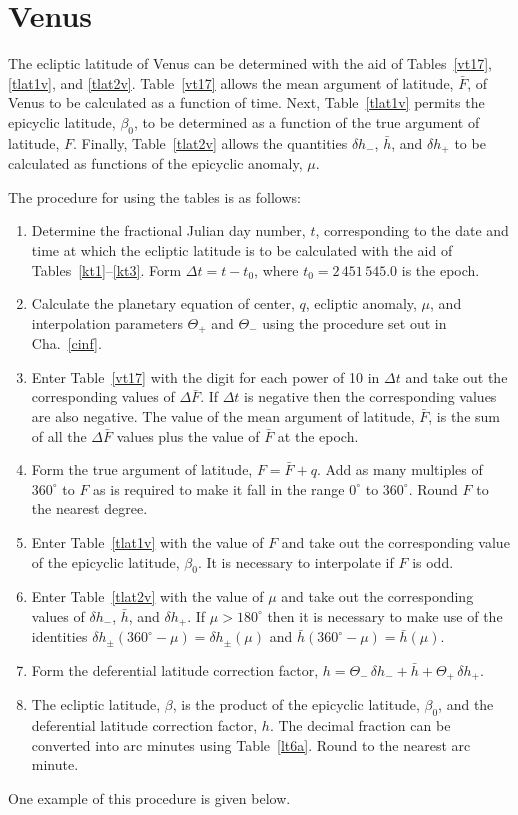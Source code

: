 \section{Venus}
The ecliptic latitude of Venus can be determined with the aid of Tables~\ref{vt17}, \ref{tlat1v}, and \ref{tlat2v}. Table~\ref{vt17} allows
the mean argument of latitude, $\bar{F}$, of Venus to be calculated as a function of
time. Next, Table~\ref{tlat1v} permits the epicyclic  latitude, $\beta_0$, to
be determined as a function of the true argument of latitude, $F$. Finally, Table~\ref{tlat2v} allows the quantities
$\delta h_-$, $\bar{h}$, and $\delta h_+$ to be calculated as functions of the epicyclic
anomaly, $\mu$. 

The procedure for using the tables is as follows:
\begin{enumerate}
\item Determine the fractional Julian day number, $t$, corresponding to the date and time
at which the ecliptic latitude is to be calculated with the aid of Tables~\ref{kt1}--\ref{kt3}. Form $\Delta t = t-t_0$, where $t_0=2\,451\,545.0$ is the epoch. 
\item Calculate the planetary equation
of center, $q$,  ecliptic anomaly, $\mu$, and 
interpolation parameters $\Theta_+$ and $\Theta_-$ using the
procedure set out in Cha.~\ref{cinf}.
\item Enter Table~\ref{vt17} with the digit for each power of 10
in ${\Delta} t$ and take out the corresponding values of $\Delta\bar{F}$. If $\Delta t$ is negative then the corresponding
values are also negative.
The value of the mean argument of latitude, $\bar{F}$, is the
sum of all the $\Delta\bar{F}$ values plus the value of $\bar{F}$ at the epoch.  
\item Form the true argument of latitude,
$F=\bar{F} + q$. Add as many multiples of $360^\circ$ to $F$ 
as is required to make it fall in the range $0^\circ$ to $360^\circ$.
Round $F$ to the nearest degree.
\item Enter Table~\ref{tlat1v} with the value of $F$ and take out the
corresponding value of the epicyclic latitude, $\beta_0$. It is necessary to interpolate if $F$ is odd.
\item Enter Table~\ref{tlat2v} with the value of $\mu$ and take
out the corresponding values of $\delta h_-$, $\bar{h}$, and
$\delta h_+$. If $\mu > 180^\circ$ then it is necessary to make use
of the identities $\delta h_\pm(360^\circ - \mu) = \delta h_\pm(\mu)$
and $\bar{h}(360^\circ - \mu) = \bar{h}(\mu)$.
\item Form the deferential latitude correction factor, $h = \Theta_-\,\delta h_-+ \bar{h}
+ \Theta_+\,\delta h_+$.
\item The ecliptic latitude, $\beta$, is the product of the epicyclic latitude, 
$\beta_0$,  and the deferential latitude correction factor, $h$.  The decimal fraction can
be converted into arc minutes
using Table~\ref{lt6a}. Round to the nearest arc minute. 
\end{enumerate}
One example of this procedure is given below.


